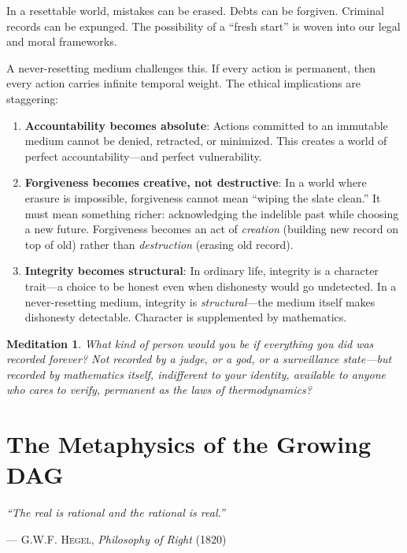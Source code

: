 \documentclass[12pt,a4paper]{article}
\theoremstyle{philosophical}
\newtheorem{meditation}{Meditation}
\begin{document}
In a resettable world, mistakes can be erased. Debts can be forgiven. Criminal records can be expunged. The possibility of a ``fresh start'' is woven into our legal and moral frameworks.

A never-resetting medium challenges this. If every action is permanent, then every action carries infinite temporal weight. The ethical implications are staggering:

\begin{enumerate}[leftmargin=*]
\item \textbf{Accountability becomes absolute}: Actions committed to an immutable medium cannot be denied, retracted, or minimized. This creates a world of perfect accountability---and perfect vulnerability.

\item \textbf{Forgiveness becomes creative, not destructive}: In a world where erasure is impossible, forgiveness cannot mean ``wiping the slate clean.'' It must mean something richer: acknowledging the indelible past while choosing a new future. Forgiveness becomes an act of \emph{creation} (building new record on top of old) rather than \emph{destruction} (erasing old record).

\item \textbf{Integrity becomes structural}: In ordinary life, integrity is a character trait---a choice to be honest even when dishonesty would go undetected. In a never-resetting medium, integrity is \emph{structural}---the medium itself makes dishonesty detectable. Character is supplemented by mathematics.
\end{enumerate}

\begin{meditation}
What kind of person would you be if everything you did was recorded forever? Not recorded by a judge, or a god, or a surveillance state---but recorded by mathematics itself, indifferent to your identity, available to anyone who cares to verify, permanent as the laws of thermodynamics?
\end{meditation}

\section{The Metaphysics of the Growing DAG}

\epigraph{\textit{``The real is rational and the rational is real.''}}{\textsc{--- G.W.F. Hegel}, \textit{Philosophy of Right} (1820)}
\end{document}
